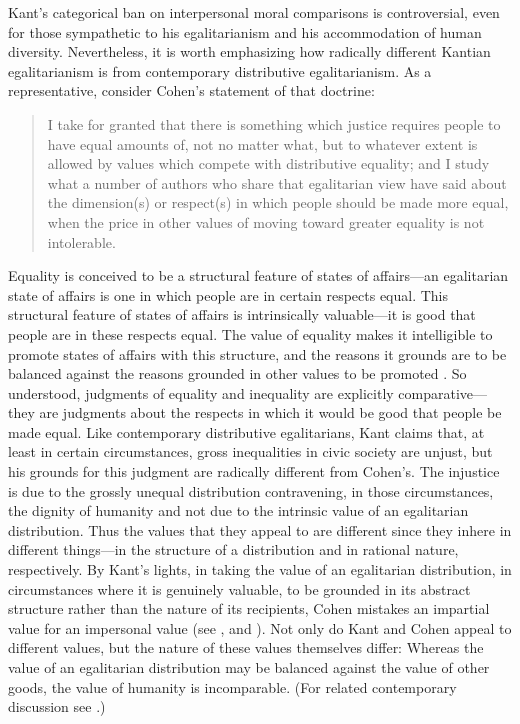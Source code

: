 \documentclass[12pt]{article}
\begin{document}
Kant's categorical ban on interpersonal moral comparisons is controversial, even for those sympathetic to his egalitarianism and his accommodation of human diversity. Nevertheless, it is worth emphasizing how radically different Kantian egalitarianism is from contemporary distributive egalitarianism. As a representative, consider Cohen's statement of that doctrine: 
\begin{quote}
	I take for granted that there is something which justice requires people to have equal amounts of, not no matter what, but to whatever extent is allowed by values which compete with distributive equality; and I study what a number of authors who share that egalitarian view have said about the dimension(s) or respect(s) in which people should be made more equal, when the price in other values of moving toward greater equality is not intolerable. \citep[906ff]{Cohen:1989vl} 
\end{quote}

Equality is conceived to be a structural feature of states of affairs---an egalitarian state of affairs is one in which people are in certain respects equal. This structural feature of states of affairs is intrinsically valuable---it is good that people are in these respects equal. The value of equality makes it intelligible to promote states of affairs with this structure, and the reasons it grounds are to be balanced against the reasons grounded in other values to be promoted \citep[compare][]{Nagel:1979tk}. So understood, judgments of equality and inequality are explicitly comparative---they are judgments about the respects in which it would be good that people be made equal. Like contemporary distributive egalitarians, Kant claims that, at least in certain circumstances, gross inequalities in civic society are unjust, but his grounds for this judgment are radically different from Cohen's. The injustice is due to the grossly unequal distribution contravening, in those circumstances, the dignity of humanity and not due to the intrinsic value of an egalitarian distribution. Thus the values that they appeal to are different since they inhere in different things---in the structure of a distribution and in rational nature, respectively. By Kant's lights, in taking the value of an egalitarian distribution, in circumstances where it is genuinely valuable, to be grounded in its abstract structure rather than the nature of its recipients, Cohen mistakes an impartial value for an impersonal value (see \citealt[\S 30]{Rawls:1971jz}, and \citealt{Munoz-Darde:2005ed}). Not only do Kant and Cohen appeal to different values, but the nature of these values themselves differ: Whereas the value of an egalitarian distribution may be balanced against the value of other goods, the value of humanity is incomparable. (For related contemporary discussion see \citealp{Frankfurt:1988ay,Frankfurt:1999lt,Munoz-Darde:2005ed}.) 
\end{document}
